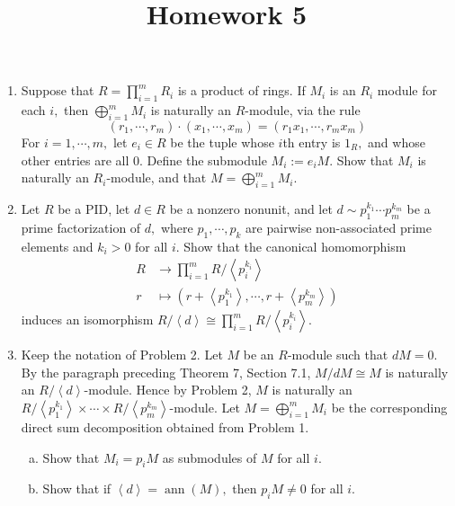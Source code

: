 \documentclass{article}
\DeclareMathOperator{\ann}{ann}
\begin{document}
\title{Homework 5}
\maketitle
\thispagestyle{fancy}

\begin{enumerate}
	\item Suppose that $R=\prod_{i=1}^{m}R_i$ is a product of rings. If $M_i$ is an $R_i$ module for each $i,$ then $\bigoplus_{i=1}^m M_i$ is naturally an $R$-module, via the rule
		\[(r_1, \cdots, r_m)\cdot(x_1, \cdots, x_m)=(r_1x_1, \cdots, r_m x_m)\]
		For $i=1, \cdots, m,$ let $e_i\in R$ be the tuple whose $i$th entry is $1_R,$ and whose other entries are all 0. Define the submodule $M_i:=e_iM.$ Show that $M_i$ is naturally an $R_i$-module, and that $M=\bigoplus_{i=1}^m M_i.$

	\item Let $R$ be a PID, let $d\in R$ be a nonzero nonunit, and let $d\sim p_1^{k_1} \cdots p_m^{k_m}$ be a prime factorization of $d,$ where $p_1, \cdots, p_k$ are pairwise non-associated prime elements and $k_i>0$ for all $i.$ Show that the canonical homomorphism
		\begin{align*}
			R &\to \prod_{i=1}^{m} R/\left< p_i^{k_i}\right> \\
			r &\mapsto \left(r+\left< p_1^{k_1}\right>, \cdots, r+\left< p_m^{k_m}\right>\right)
		\end{align*}
		induces an isomorphism $R/\left< d\right>\cong \prod_{i=1}^{m} R/\left< p_i^{k_i}\right>.$ 

	\item Keep the notation of Problem 2. Let $M$ be an $R$-module such that $dM=0.$ By the paragraph preceding Theorem 7, Section 7.1, $M/dM\cong M$ is naturally an $R/\left< d\right>$-module. Hence by Problem 2, $M$ is naturally an $R/\left< p_1^{k_1}\right>\times\cdots\times R/\left< p_m^{k_m}\right>$-module. Let $M=\bigoplus_{i=1}^m M_i$ be the corresponding direct sum decomposition obtained from Problem 1.
		\begin{enumerate}[(a)]
			\item Show that $M_i=p_i M$ as submodules of $M$ for all $i.$

			\item Show that if $\left< d\right>=\ann(M),$ then $p_i M\neq 0$ for all $i.$
				
		\end{enumerate}

\end{enumerate}
\end{document}
